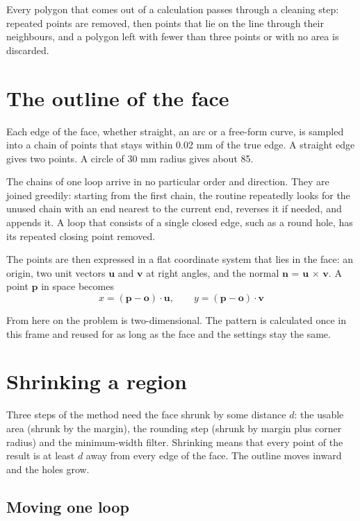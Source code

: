 \documentclass[11pt,a4paper]{article}
\begin{document}
Every polygon that comes out of a calculation passes through a cleaning step: repeated points are removed, then points that lie on the line through their neighbours, and a polygon left with fewer than three points or with no area is discarded. 

\section{The outline of the face}
 

Each edge of the face, whether straight, an arc or a free-form curve, is sampled into a chain of points that stays within 0.02 mm of the true edge. A straight edge gives two points. A circle of 30 mm radius gives about 85. 

The chains of one loop arrive in no particular order and direction. They are joined greedily: starting from the first chain, the routine repeatedly looks for the unused chain with an end nearest to the current end, reverses it if needed, and appends it. A loop that consists of a single closed edge, such as a round hole, has its repeated closing point removed. 

The points are then expressed in a flat coordinate system that lies in the face: an origin, two unit vectors $\mathbf{u}$ and $\mathbf{v}$ at right angles, and the normal $\mathbf{n}$ = $\mathbf{u}$ $\times $ $\mathbf{v}$. A point $\mathbf{p}$ in space becomes 
\begin{equation}
x = (\mathbf{p} - \mathbf{o})\cdot\mathbf{u}, \qquad y = (\mathbf{p} - \mathbf{o})\cdot\mathbf{v}
\end{equation}
 

From here on the problem is two-dimensional. The pattern is calculated once in this frame and reused for as long as the face and the settings stay the same. 

\section{Shrinking a region}
 

Three steps of the method need the face shrunk by some distance $d$: the usable area (shrunk by the margin), the rounding step (shrunk by margin plus corner radius) and the minimum-width filter. Shrinking means that every point of the result is at least $d$ away from every edge of the face. The outline moves inward and the holes grow. 

\subsection{Moving one loop}
 
\end{document}
